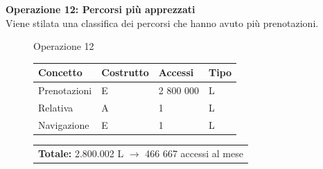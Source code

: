 \documentclass[a4paper, titlepage]{report}
\begin{document}
\vspace{1cm}
	\noindent
	\textbf{{\large {Operazione 12: }}}\textbf{Percorsi più apprezzati}  \\
	Viene stilata una classifica dei percorsi che hanno avuto più prenotazioni.
	\begin{figure}[h]
		\centering
		Operazione 12 \\
		\begin{tabular}{L{3cm}C{2.5cm}C{4.5cm}C{2.5cm}}
			\rule[-2mm]{0mm}{0.65cm}{}
			\textbf{Concetto} & \textbf{Costrutto} &\textbf{Accessi} & \textbf{Tipo} \\
			\hline\rule[-2mm]{0mm}{0.65cm}{}
			Prenotazioni & E & 2 800 000 & L \\
			\hline\rule[-2mm]{0mm}{0.65cm}{}
			Relativa & A & 1 & L \\
			\hline\rule[-2mm]{0mm}{0.65cm}{}
			Navigazione & E & 1 & L \\
		\end{tabular}
		\begin{tabular}{C{13.9cm}}
			\rule[-4mm]{0mm}{1cm}{}	
			 \textbf{Totale:} 2.800.002 L $\to$ 466 667 accessi al mese
		\end{tabular}
	\end{figure}
	
	

\newpage
	
\end{document}
